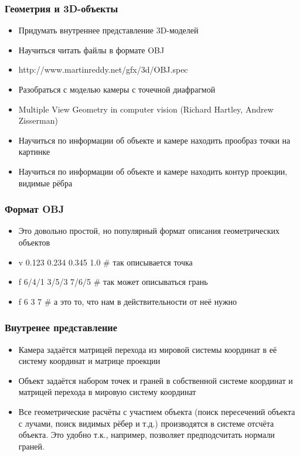 ﻿\begin{frame}\frametitle{Геометрия и 3D-объекты}
    \begin{itemize}
        \item Придумать внутреннее представление 3D-моделей
        \pause
        \item Научиться читать файлы в формате OBJ
        \item http://www.martinreddy.net/gfx/3d/OBJ.spec
        \pause
        \item Разобраться с моделью камеры с точечной диафрагмой
        \item Multiple View Geometry in computer vision (Richard Hartley, Andrew Zisserman)
        \pause
        \item Научиться по информации об объекте и камере находить прообраз точки на картинке
        \pause
        \item Научиться по информации об объекте и камере находить контур проекции, видимые рёбра
    \end{itemize}
\end{frame}

\begin{frame}\frametitle{Формат OBJ}
    \begin{itemize}
        \item Это довольно простой, но популярный формат описания геометрических объектов
        \pause
        \item v 0.123 0.234 0.345 1.0 # так описывается точка
        \item f 6/4/1 3/5/3 7/6/5 # так может описываться грань
        \item f 6 3 7 # а это то, что нам в действительности от неё нужно
    \end{itemize}
\end{frame}

\begin{frame}\frametitle{Внутренее представление}
    \begin{itemize}
        \item Камера задаётся матрицей перехода из мировой системы координат в её систему координат и матрице проекции
        \pause
        \item Объект задаётся набором точек и граней в собственной системе координат и матрицей перехода в мировую систему координат
        \item Все геометрические расчёты с участием объекта (поиск пересечений объекта с лучами, поиск видимых рёбер и т.д.) производятся в системе отсчёта объекта. Это удобно т.к., например, позволяет предподсчитать нормали граней.
    \end{itemize}
\end{frame}

